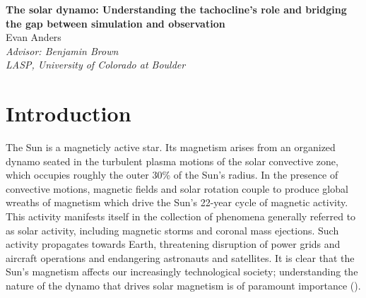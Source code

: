 \documentclass[aasms,12pt]{article}
\begin{document}
\begin{center}
   \large\textbf{The solar dynamo: Understanding the tachocline's role and bridging
	the gap between simulation and observation}\\
   \vspace{0.4cm}
   \large{Evan Anders}\\
   \vspace{0.4cm}
   \normalsize\textit{Advisor: Benjamin Brown}\\
   \normalsize\textit{LASP, University of Colorado at Boulder}\\
\end{center}






\section{Introduction}
The Sun is a magneticly active star.  Its magnetism arises from an 
organized dynamo seated in the turbulent plasma
motions of the solar convective zone, which occupies roughly the outer 30\%
of the Sun's radius.  In the presence of
convective motions, magnetic fields and solar rotation couple to produce global
wreaths of magnetism which drive the Sun's 22-year cycle of magnetic activity.
This activity manifests itself in the collection of phenomena generally
referred to as solar activity, including magnetic storms and coronal mass
ejections.  Such activity propagates towards Earth, threatening disruption of 
power
grids and aircraft operations and endangering astronauts and satellites.  It is
clear that the Sun's magnetism affects our increasingly technological society;
understanding the nature of the dynamo that drives solar magnetism is of
paramount importance (\citealt{Toomre2009, Charbonneau2014}).
\end{document}
